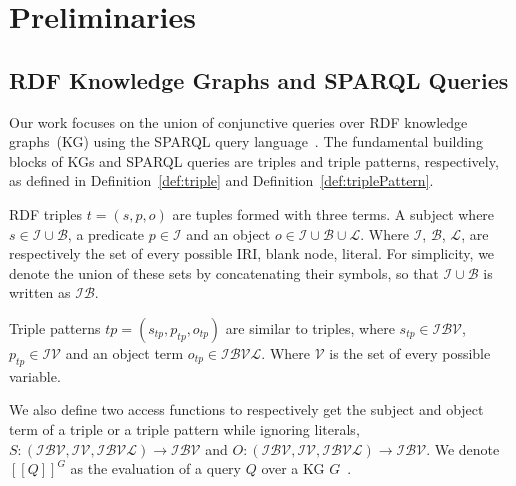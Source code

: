 \section{Preliminaries}\label{sec:preliminaries}

\subsection{RDF Knowledge Graphs and SPARQL Queries}

Our work focuses on the union of conjunctive queries over RDF knowledge graphs~(KG) using the SPARQL query language~\cite{w3SPARQLQuery}.
The fundamental building blocks of KGs and SPARQL queries are triples and triple patterns, respectively, as defined in Definition~\ref{def:triple} and Definition~\ref{def:triplePattern}.

\begin{definition}[Triple]\label{def:triple}
    RDF triples $t = (s,p,o)$ are tuples formed with three terms. A subject where $s \in \mathcal{I} \cup \mathcal{B}$, a predicate $p \in \mathcal{I}$ and an object $o \in \mathcal{I} \cup \mathcal{B} \cup \mathcal{L}$.
    Where $\mathcal{I}$, $\mathcal{B}$, $\mathcal{L}$,  are respectively the set of every possible IRI, blank node, literal.
    For simplicity, we denote the union of these sets by concatenating their symbols, so that $ \mathcal{I} \cup \mathcal{B}$ is written as $ \mathcal{I} \mathcal{B}$.
\end{definition}

\begin{definition}\label{def:triplePattern}
    Triple patterns $tp = (s_{tp}, p_{tp}, o_{tp})$ are similar to triples, where $s_{tp} \in \mathcal{I} \mathcal{B} \mathcal{V}$,
    $p_{tp} \in \mathcal{I} \mathcal{V}$ and an object term  $o_{tp} \in \mathcal{I} \mathcal{B} \mathcal{V} \mathcal{L}$.
    Where $\mathcal{V}$ is the set of every possible variable.
\end{definition}

We also define two access functions to respectively get the subject and object term of a triple or a triple pattern while ignoring literals,
$ S:  (\mathcal{I} \mathcal{B} \mathcal{V}, \mathcal{I} \mathcal{V}, \mathcal{I} \mathcal{B} \mathcal{V} \mathcal{L}) \rightarrow \mathcal{I} \mathcal{B} \mathcal{V}$ and $O: (\mathcal{I} \mathcal{B} \mathcal{V}, \mathcal{I} \mathcal{V}, \mathcal{I} \mathcal{B} \mathcal{V} \mathcal{L}) \rightarrow \mathcal{I} \mathcal{B} \mathcal{V}$.
We denote $[\![ Q ]\!]^{G}$ as the evaluation of a query $Q$ over a KG $G$~\cite{Angles2008}.

